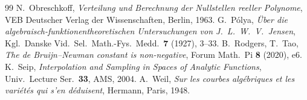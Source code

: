 \documentclass[11pt]{amsart}
\theoremstyle{definition}
\theoremstyle{remark}
\begin{document}
\begin{thebibliography}{99}
 N.~Obreschkoff, \emph{Verteilung und Berechnung der Nullstellen reeller Polynome}, VEB Deutscher Verlag der Wissenschaften, Berlin, 1963.
 G.~Pólya, \emph{Über die algebraisch-funktionentheoretischen Untersuchungen von J.~L.~W.~V.~Jensen}, Kgl.\ Danske Vid.\ Sel.\ Math.-Fys.\ Medd.\ \textbf{7} (1927), 3--33.
 B.~Rodgers, T.~Tao, \emph{The de Bruijn--Newman constant is non-negative}, Forum Math.\ Pi \textbf{8} (2020), e6.
 K.~Seip, \emph{Interpolation and Sampling in Spaces of Analytic Functions}, Univ.\ Lecture Ser.\ \textbf{33}, AMS, 2004.
 A.~Weil, \emph{Sur les courbes algébriques et les variétés qui s'en déduisent}, Hermann, Paris, 1948.
\end{thebibliography}
\end{document}

